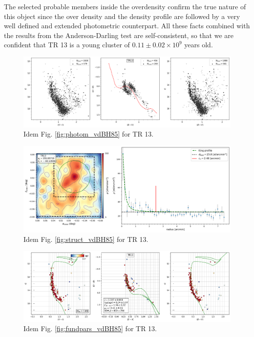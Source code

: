 \documentclass[draft]{aa}
\begin{document}
The selected probable members inside the overdensity confirm the
true nature of this object since the over density and the density profile are
followed by a very well defined and extended photometric counterpart. All these
facts combined with the results from the Anderson-Darling test are
self-consistent, so that we are confident that TR 13 is a young cluster of
$0.11\pm0.02\times10^9$ years old.

\begin{figure}[ht]
    \centering
    \includegraphics[width=\hsize]{../figs/obs_TR13.png}
    \caption{Idem Fig. \ref{fig:photom_vdBH85} for TR 13.}
    \label{fig39}
\end{figure}
\begin{figure}[ht]
    \centering
    \includegraphics[width=\hsize]{../figs/dmap_trumpler13.png}
    \caption{Idem Fig. \ref{fig:struct_vdBH85} for TR 13.}
    \label{fig40}
\end{figure}
\begin{figure}[ht]
    \centering
    \includegraphics[width=\hsize]{../figs/cmds_tr13.png}
    \caption{Idem Fig. \ref{fig:fundpars_vdBH85} for TR 13.}
    \label{fig41}
\end{figure}
\end{document}
